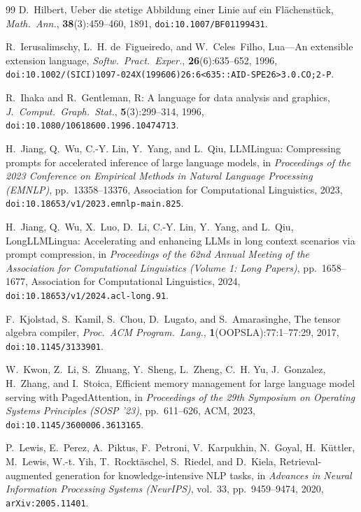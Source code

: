 \documentclass[11pt]{article}
\theoremstyle{plain}
\theoremstyle{definition}
\begin{document}
\begin{thebibliography}{99}
D.~Hilbert,
Ueber die stetige Abbildung einer Linie auf ein Fl\"achenst\"uck,
\emph{Math.\ Ann.}, \textbf{38}(3):459--460, 1891, \texttt{doi:10.1007/BF01199431}.

R.~Ierusalimschy, L.~H. de~Figueiredo, and W.~Celes~Filho,
Lua---An extensible extension language,
\emph{Softw.\ Pract.\ Exper.}, \textbf{26}(6):635--652, 1996, \texttt{doi:10.1002/(SICI)1097-024X(199606)26:6<635::AID-SPE26>3.0.CO;2-P}.

R.~Ihaka and R.~Gentleman,
R: A language for data analysis and graphics,
\emph{J.\ Comput.\ Graph.\ Stat.}, \textbf{5}(3):299--314, 1996, \texttt{doi:10.1080/10618600.1996.10474713}.

H.~Jiang, Q.~Wu, C.-Y. Lin, Y.~Yang, and L.~Qiu,
LLMLingua: Compressing prompts for accelerated inference of large language models,
in \emph{Proceedings of the 2023 Conference on Empirical Methods in Natural Language Processing (EMNLP)}, pp.~13358--13376, Association for Computational Linguistics, 2023, \texttt{doi:10.18653/v1/2023.emnlp-main.825}.

H.~Jiang, Q.~Wu, X.~Luo, D.~Li, C.-Y. Lin, Y.~Yang, and L.~Qiu,
LongLLMLingua: Accelerating and enhancing LLMs in long context scenarios via prompt compression,
in \emph{Proceedings of the 62nd Annual Meeting of the Association for Computational Linguistics (Volume 1: Long Papers)}, pp.~1658--1677, Association for Computational Linguistics, 2024, \texttt{doi:10.18653/v1/2024.acl-long.91}.

F.~Kjolstad, S.~Kamil, S.~Chou, D.~Lugato, and S.~Amarasinghe,
The tensor algebra compiler,
\emph{Proc.\ ACM Program.\ Lang.}, \textbf{1}(OOPSLA):77:1--77:29, 2017, \texttt{doi:10.1145/3133901}.

W.~Kwon, Z.~Li, S.~Zhuang, Y.~Sheng, L.~Zheng, C.~H. Yu, J.~Gonzalez, H.~Zhang, and I.~Stoica,
Efficient memory management for large language model serving with PagedAttention,
in \emph{Proceedings of the 29th Symposium on Operating Systems Principles (SOSP '23)}, pp.~611--626, ACM, 2023, \texttt{doi:10.1145/3600006.3613165}.

P.~Lewis, E.~Perez, A.~Piktus, F.~Petroni, V.~Karpukhin, N.~Goyal, H.~K\"uttler, M.~Lewis, W.-t. Yih, T.~Rockt\"aschel, S.~Riedel, and D.~Kiela,
Retrieval-augmented generation for knowledge-intensive NLP tasks,
in \emph{Advances in Neural Information Processing Systems (NeurIPS)}, vol.~33, pp.~9459--9474, 2020, \texttt{arXiv:2005.11401}.


\end{thebibliography}
\end{document}
